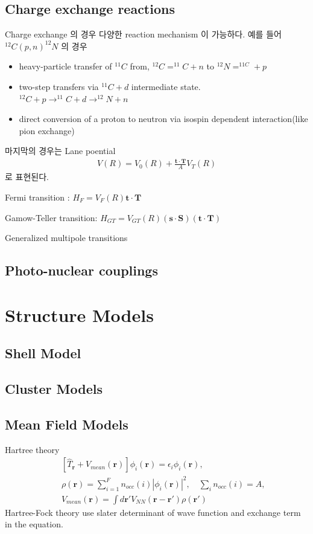 \documentclass[11pt]{book}
\def\bm{\boldsymbol}
\def\vr{{\bm r}}
\newcommand{\bea}{\begin{eqnarray}}
\newcommand{\eea}{\end{eqnarray}}
\newcommand{\no}{\nonumber \\}
\begin{document}
\subsection{Charge exchange reactions}
Charge exchange 의 경우 다양한 reaction mechanism 이 가능하다. 
예를 들어 $^{12}C(p,n)^{12}N$ 의 경우
\begin{itemize}
	\item heavy-particle transfer of $^{11}C$ from, $^{12}C=^{11}C+n$ to 
	        $^{12}N=^{11C}+p$
	\item two-step transfers via $^{11}C+d$ intermediate state. 
	        $^{12}C+p\to ^{11}C+d\to ^{12}N+n$
	\item direct conversion of a proton to neutron via isospin dependent interaction(like pion exchange)                
\end{itemize}
마지막의 경우는 Lane poential
\bea 
V(R)=V_0(R)+\frac{{\bm t}\cdot{\bm T}}{A} V_T(R)
\eea 
로 표현된다. 

Fermi transition : $H_F=V_F(R){\bm t}\cdot{\bm T}$

Gamow-Teller transition: $H_{GT}=V_{GT}(R)({\bm s}\cdot{\bm S})({\bm t}\cdot{\bm T})$

Generalized multipole transitions

\subsection{Photo-nuclear couplings}

\section{Structure Models}

\subsection{Shell Model}
\subsection{Cluster Models}
\subsection{Mean Field Models}
Hartree theory
\bea
& &[\hat{T}_\vr+V_{mean}(\vr)]\phi_i(\vr)=\epsilon_i \phi_i(\vr),\no
& &\rho(\vr)=\sum_{i=1}^{F} n_{occ}(i)|\phi_i(\vr)|^2,\quad \sum_i n_{occ}(i)=A,\no 
& &V_{mean}(\vr)=\int d\vr' V_{NN}(\vr-\vr')\rho(\vr')
\eea 
Hartree-Fock theory use slater determinant of wave function and exchange term in the equation. 
\end{document}
